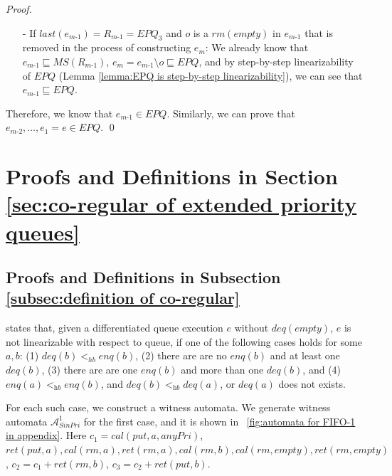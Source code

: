 \begin {proof}
\begin{itemize}
\item[-] If $\textit{last}(e_{\textit{m-1}}) = R_{\textit{m-1}} = \textit{EPQ}_3$ and $o$ is a $\textit{rm}(\textit{empty})$ in $e_{\textit{m-1}}$ that is removed in the process of constructing $e_m$: We already know that $e_{\textit{m-1}} \sqsubseteq \textit{MS}(R_{\textit{m-1}})$, $e_m = e_{\textit{m-1}} \setminus o \sqsubseteq \textit{EPQ}$, and by step-by-step linearizability of $\textit{EPQ}$ (Lemma \ref{lemma:EPQ is step-by-step linearizability}), we can see that $e_{\textit{m-1}} \sqsubseteq \textit{EPQ}$.
\end{itemize}

Therefore, we know that $e_{\textit{m-1}} \in \textit{EPQ}$. Similarly, we can prove that $e_{\textit{m-2}},\ldots,e_1 = e \in \textit{EPQ}$. \qed
\end {proof}


\section{Proofs and Definitions in Section \ref{sec:co-regular of extended priority queues}}
\label{sec:appendix proof and definition in section co-regular of extended priority queues}


\subsection{Proofs and Definitions in Subsection \ref{subsec:definition of co-regular}}
\label{sec:appendix proof and definition in section definition of co-regular}

\cite{Bouajjani:2015} states that, given a differentiated queue execution $e$ without $\textit{deq}(\textit{empty})$, $e$ is not linearizable with respect to queue, if one of the following cases holds for some $a,b$: (1) $\textit{deq}(b) <_{hb} \textit{enq}(b)$, (2) there are are no $\textit{enq}(b)$ and at least one $\textit{deq}(b)$, (3) there are are one $\textit{enq}(b)$ and more than one $\textit{deq}(b)$, and (4) $\textit{enq}(a) <_{\textit{hb}} \textit{enq}(b)$, and $\textit{deq}(b) <_{\textit{hb}} \textit{deq}(a)$, or $\textit{deq}(a)$ does not exists.

For each such case, we construct a witness automata. We generate witness automata $\mathcal{A}_{\textit{SinPri}}^1$ for the first case, and it is shown in \figurename~\ref{fig:automata for FIFO-1 in appendix}. Here $c_1 = \textit{cal}(\textit{put},a,\textit{anyPri})$, $\textit{ret}(\textit{put},a), \textit{cal}(\textit{rm},a),\textit{ret}(\textit{rm},a),\textit{cal}(\textit{rm},b),\textit{cal}(\textit{rm},\textit{empty}),\textit{ret}(\textit{rm},\textit{empty})$, $c_2 = c_1 + \textit{ret}(\textit{rm},b)$, $c_3 = c_2 + \textit{ret}(\textit{put},b)$.


